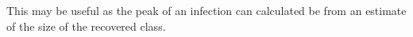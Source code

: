 This may be useful as the peak of an infection can calculated be from an estimate of the size of the recovered class.
